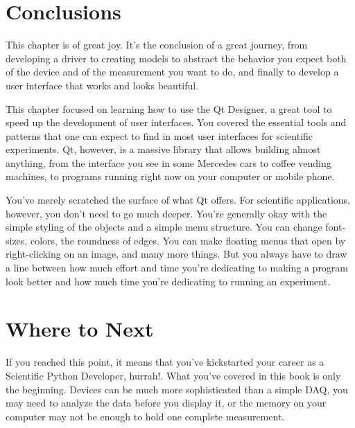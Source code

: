 
\section{Conclusions}\label{sec:conclusions}
This chapter is of great joy. It's the conclusion of a great journey, from developing a driver to creating models to abstract the behavior you expect both of the device and of the measurement you want to do, and finally to develop a user interface that works and looks beautiful.

This chapter focused on learning how to use the Qt Designer, a great tool to speed up the development of user interfaces. You covered the essential tools and patterns that one can expect to find in most user interfaces for scientific experiments. Qt, however, is a massive library that allows building almost anything, from the interface you see in some Mercedes cars to coffee vending machines, to programs running right now on your computer or mobile phone.

You've merely scratched the surface of what Qt offers. For scientific applications, however, you don't need to go much deeper. You're generally okay with the simple styling of the objects and a simple menu structure. You can change font-sizes, colors, the roundness of edges. You can make floating menus that open by right-clicking on an image, and many more things. But you always have to draw a line between how much effort and time you're dedicating to making a program look better and how much time you're dedicating to running an experiment.

\section{Where to Next}\label{sec:where-to-next}
If you reached this point, it means that you've kickstarted your career as a Scientific Python Developer, hurrah!. What you've covered in this book is only the beginning. Devices can be much more sophisticated than a simple DAQ, you may need to analyze the data before you display it, or the memory on your computer may not be enough to hold one complete measurement.

